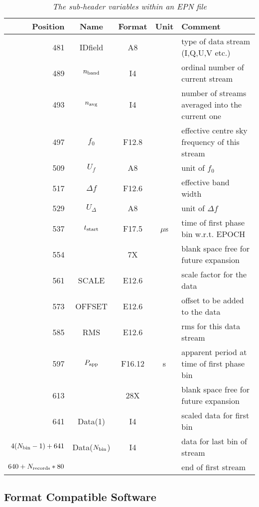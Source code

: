 \documentclass[11pt]{article}
\begin{document}
\begin{table}
\begin{center}
\footnotesize
\begin{tabular}{|rcccp{8cm}|}
\hline
Position & Name & Format & Unit & Comment \\
\hline 
\hline
481  & IDfield &  A8 & &  type of data stream (I,Q,U,V etc.) \\
489  & $n_{\rm band}$& I4 & &  ordinal number of current stream  \\
493  & $n_{\rm avg}$ & I4 & & number of streams averaged into the current one \\
497  & $ f_0$ & F12.8 &  & effective centre sky frequency of this stream\\
509  & $ U_f$ & A8 &  & unit of $f_0$ \\
517  & $ \Delta f $&  F12.6 &  & effective band width \\
529  & $ U_{\Delta} $&  A8 &  & unit of $\Delta f$\\
537  & $ t_{\rm start} $ & F17.5 & $\mu$s& time of first phase bin w.r.t. EPOCH \\
554  &               & 7X    &        & blank space free for future expansion\\
\hline
561  & SCALE  & E12.6 &  & scale factor for the data\\
573  & OFFSET & E12.6 &  & offset to be added to the data \\
585  & RMS    & E12.6 &  & rms for this data stream\\
597   & $P_{\rm app}$ &  F16.12 & s & apparent period at time of first phase bin\\
613  &     &  28X    &       & blank space free for future expansion\\
\hline
641 & Data(1)& I4 & & scaled data for first bin \\
$ 4 (N_{\rm bin}-1)+641$& Data($N_{\rm bin}$) & I4 &  & 
data for last bin of stream\\
\hline 
$640 + N_{\rm records}*80$& & & & end of first stream \\
\hline
\end{tabular}
\normalsize
\caption{\sl The sub-header variables within an EPN file}
\label{epnsubheader}
\end{center}
\end{table}

\subsection*{Format Compatible Software}
\end{document}
